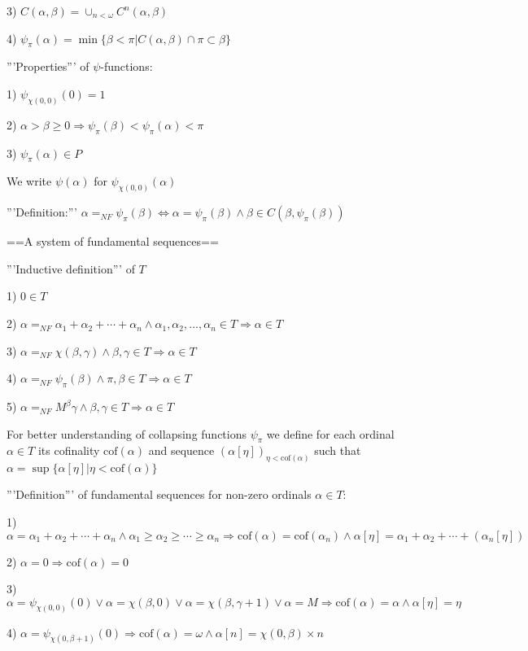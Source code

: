 \documentclass[10pt]{article}
\begin{document}
3) \(C(\alpha,\beta)=\cup_{n<\omega}C^{n}(\alpha, \beta)\)

4) \(\psi_\pi(\alpha)=\min\{\beta<\pi|C(\alpha,\beta)\cap \pi\subset\beta\}\)

'''Properties''' of  \(\psi\)-functions:

1) \(\psi_{\chi(0,0)}(0)=1\) 

2) \(\alpha>\beta\geq 0 \Rightarrow \psi_\pi(\beta)<\psi_ \pi(\alpha)<\pi\)

3) \(\psi_\pi(\alpha)\in P\)

We write \(\psi(\alpha)\)  for \(\psi_{\chi(0,0)}(\alpha)\)

'''Definition:''' \(\alpha=_{NF}\psi_\pi(\beta)\Leftrightarrow\alpha=\psi_\pi(\beta) \wedge\beta\in C(\beta, \psi_\pi(\beta))\)

==A system of fundamental sequences==

'''Inductive definition''' of \(T\)

1) \(0 \in T\)

2) \(\alpha=_{NF}\alpha_1+\alpha_2+\cdots+\alpha_n\wedge\alpha_1,\alpha_2,...,\alpha_n\in T\Rightarrow\alpha\in T\)

3) \(\alpha=_{NF}\chi(\beta,\gamma)\wedge\beta,\gamma\in T\Rightarrow\alpha\in T\)

4) \(\alpha=_{NF}\psi_\pi(\beta)\wedge\pi,\beta\in T\Rightarrow\alpha\in T\)

5) \(\alpha=_{NF}M^\beta\gamma\wedge\beta,\gamma\in T\Rightarrow\alpha\in T\)

For better understanding of collapsing functions \(\psi_\pi\) we define for each ordinal  \(\alpha\in T\)  its cofinality \(\text{cof}(\alpha) \) and  sequence   \( (\alpha[\eta])_{\eta<\text{cof}(\alpha) }\)  such that \(\alpha=\sup\{\alpha[\eta]|\eta<\text{cof}(\alpha) \}\)

'''Definition''' of fundamental sequences for non-zero ordinals \(\alpha\in T\):

1) \(\alpha=\alpha_1+\alpha_2+\cdots+\alpha_n \wedge \alpha_1\geq\alpha_2\geq\cdots\geq\alpha_n \Rightarrow \text{cof} (\alpha)= \text{cof} (\alpha_n) \wedge \alpha[\eta]=\alpha_1+\alpha_2+\cdots+(\alpha_n[\eta])\)

2) \(\alpha=0\Rightarrow\text{cof}(\alpha)=0\) 


3) \(\alpha=\psi _{\chi(0,0)}(0) \vee \alpha=\chi(\beta,0) \vee \alpha=\chi(\beta,\gamma+1) \vee \alpha=M\Rightarrow \text{cof} (\alpha)=\alpha \wedge \alpha[\eta]=\eta\)

4) \(\alpha=\psi _{\chi(0,\beta+1)}(0) \Rightarrow \text{cof}(\alpha)=\omega \wedge \alpha[n]=\chi(0,\beta)\times n\)
\end{document}
